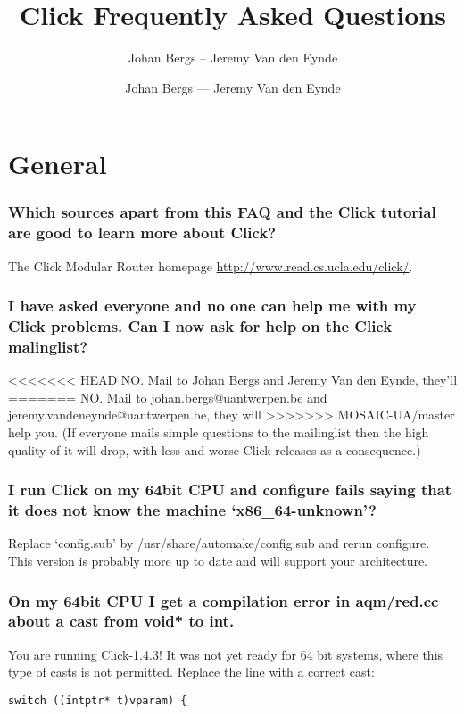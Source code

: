 \documentclass[a4paper]{article}
\author{Johan Bergs -- Jeremy Van den Eynde}
\author{Johan Bergs --- Jeremy Van den Eynde}
\title{Click Frequently Asked Questions}
\date{}
\begin{document}
\maketitle
\tableofcontents

\section{General} %
\label{sec:general}

\subsubsection*{Which sources apart from this FAQ and the Click tutorial are good to learn more about Click?} %
The Click Modular Router homepage \url{http://www.read.cs.ucla.edu/click/}.

\subsubsection*{I have asked everyone and no one can help me with my Click problems. Can
I now ask for help on the Click malinglist?}

<<<<<<< HEAD
NO. Mail to Johan Bergs and Jeremy Van den Eynde, they'll
=======
NO. Mail to johan.bergs@uantwerpen.be and jeremy.vandeneynde@uantwerpen.be, they will
>>>>>>> MOSAIC-UA/master
help you. (If everyone mails simple questions to the mailinglist then
the high quality of it will drop, with less and worse Click releases as
a consequence.)

\subsubsection*{I run Click on my 64bit CPU and configure fails saying that it
does not know the machine `x86\_64-unknown'?}

Replace `config.sub' by /usr/share/automake/config.sub and rerun
configure. This version is probably more up to date and will support
your architecture.

\subsubsection*{On my 64bit CPU I get a compilation error in aqm/red.cc about a cast
from void* to int.}

You are running Click-1.4.3! It was not yet ready for 64 bit systems,
where this type of casts is not permitted. Replace the line with a
correct cast:
\begin{lstlisting}
switch ((intptr* t)vparam) {
\end{lstlisting}
\end{document}
